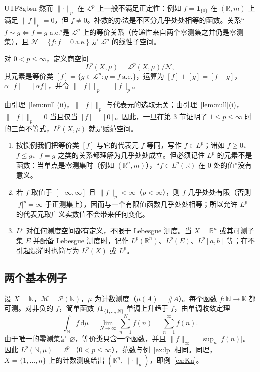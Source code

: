 \documentclass[11pt]{article}
\newcommand{\K}{\mathbb{K}}
\newcommand{\R}{\mathbb{R}}
\newcommand{\N}{\mathbb{N}}
\newcommand{\M}{\mathcal{M}}
\newcommand{\norm}[1]{\lVert #1\rVert}
\newcommand{\dmu}{\,\mathrm{d}\mu}
\newcommand{\ind}{\mathbf{1}}
\begin{document}
\begin{CJK*}{UTF8}{gbsn}
然而 $\norm{\cdot}_{p}$ 在 $\mathcal{L}^{p}$ 上一般不满足正定性：例如 $f=\ind_{\{0\}}$ 在 $(\R,m)$ 上满足 $\norm{f}_{p}=0$，但 $f\ne0$。补救的办法是不区分几乎处处相等的函数。关系“$f\sim g\iff f=g$ a.e.”是 $\mathcal{L}^{p}$ 上的等价关系（传递性来自两个零测集之并仍是零测集），且 $\mathcal{N}=\{f:f=0\ \text{a.e.}\}$ 是 $\mathcal{L}^{p}$ 的线性子空间。

\begin{definition}[$L^{p}$ 空间]\label{def:Lp}
对 $0<p\le\infty$，定义商空间
\[
L^{p}(X,\mu)=\mathcal{L}^{p}(X,\mu)/\mathcal{N},
\]
其元素是等价类 $[f]=\{g\in\mathcal{L}^{p}:g=f\ \text{a.e.}\}$，运算为 $[f]+[g]=[f+g]$，$\alpha[f]=[\alpha f]$，并令 $\norm{[f]}_{p}=\norm{f}_{p}$。
\end{definition}

由引理~\ref{lem:null}(ii)，$\norm{[f]}_{p}$ 与代表元的选取无关；由引理~\ref{lem:null}(i)，$\norm{[f]}_{p}=0$ 当且仅当 $[f]=[0]$。因此，一旦在第 3 节证明了 $1\le p\le\infty$ 时的三角不等式，$L^{p}(X,\mu)$ 就是赋范空间。

\begin{remark}[记号约定]\label{rem:convention}
\begin{enumerate}
\item 按惯例我们把等价类 $[f]$ 与它的代表元 $f$ 等同，写作 $f\in L^{p}$；诸如 $f\ge0$、$f\le g$、$f=g$ 之类的关系都理解为几乎处处成立。但必须记住 $L^{p}$ 的元素不是函数：当单点是零测集时（例如 $(\R^{n},m)$），“$f\in L^{p}(\R)$ 在 $0$ 处的值”没有意义。
\item 若 $f$ 取值于 $[-\infty,\infty]$ 且 $\norm{f}_{p}<\infty$（$p<\infty$），则 $f$ 几乎处处有限（否则 $|f|^{p}=\infty$ 于正测集上），因而与一个有限值函数几乎处处相等；所以允许 $L^{p}$ 的代表元取广义实数值不会带来任何变化。
\item $L^{p}$ 对任何测度空间都有定义，不限于 Lebesgue 测度。当 $X=\R^{n}$ 或其可测子集 $E$ 并配备 Lebesgue 测度时，记作 $L^{p}(\R^{n})$、$L^{p}(E)$、$L^{p}[a,b]$ 等；在不引起混淆时也简写为 $L^{p}(X)$ 或 $L^{p}$。
\end{enumerate}
\end{remark}

\subsection{两个基本例子}

\begin{example}\label{ex:counting}
设 $X=\N$，$\M=\mathcal{P}(\N)$，$\mu$ 为计数测度（$\mu(A)=\#A$）。每个函数 $f:\N\to\K$ 都可测。对非负的 $f$，简单函数 $f\ind_{\{1,\dots,N\}}$ 单调上升趋于 $f$，由单调收敛定理
\[
\int_{\N}f\dmu=\lim_{N\to\infty}\sum_{n=1}^{N}f(n)=\sum_{n=1}^{\infty}f(n).
\]
由于唯一的零测集是 $\varnothing$，等价类只含一个函数，并且 $\norm{f}_{\infty}=\sup_{n}|f(n)|$。因此 $L^{p}(\N,\mu)=\ell^{p}$（$0<p\le\infty$），范数与例~\ref{ex:lp} 相同。同理，$X=\{1,\dots,n\}$ 上的计数测度给出 $(\K^{n},\norm{\cdot}_{p})$，即例~\ref{ex:Kn}。
\end{example}


\end{CJK*}
\end{document}
